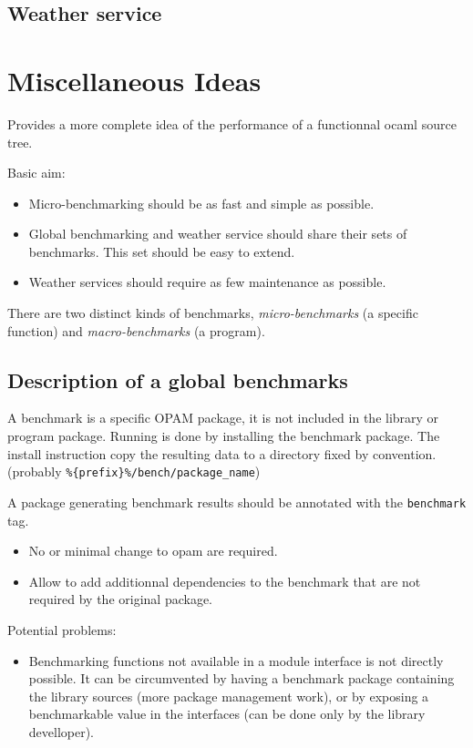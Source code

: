 \documentclass[11pt,a4paper]{article}
\begin{document}
\subsection{Weather service}

\section{Miscellaneous Ideas}

Provides a more complete idea of the performance of a functionnal
ocaml source tree.

Basic aim:
\begin{itemize}
\item Micro-benchmarking should be as fast and simple as possible.
\item Global benchmarking and weather service should share their sets
  of benchmarks. This set should be easy to extend.
\item Weather services should require as few maintenance as possible.
\end{itemize}

There are two distinct kinds of benchmarks, \emph{micro-benchmarks} (a specific
function) and \emph{macro-benchmarks} (a program).

\subsection{Description of a global benchmarks}

A benchmark is a specific OPAM package, it is not included in the
library or program package. Running is done by installing the
benchmark package. The install instruction copy the resulting data to
a directory fixed by convention. (probably
\texttt{\%\{prefix\}\%/bench/package\_name})

A package generating benchmark results should be annotated with the
\texttt{benchmark} tag.

\begin{itemize}
\item No or minimal change to opam are required.
\item Allow to add additionnal dependencies to the benchmark that are
  not required by the original package.
\end{itemize}

Potential problems:
\begin{itemize}
\item Benchmarking functions not available in a module interface is
  not directly possible. It can be circumvented by having a benchmark
  package containing the library sources (more package management
  work), or by exposing a benchmarkable value in the interfaces (can
  be done only by the library develloper).
\end{itemize}
\end{document}
